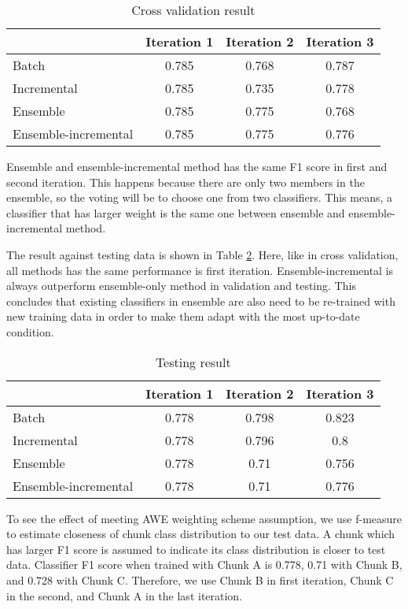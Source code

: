 \documentclass[conference]{IEEEtran}
\begin{document}
\begin{table}[!htb]
\renewcommand{\arraystretch}{1.3}
\caption{Cross validation result}
\label{result_k}
\centering
\begin{tabular}{|l|c|c|c|}
\hline
 & Iteration 1 & Iteration 2 & Iteration 3\\
\hline
Batch & 0.785 & 0.768 & 0.787\\
\hline
Incremental & 0.785 & 0.735 & 0.778\\
\hline
Ensemble & 0.785 & 0.775 & 0.768\\
\hline
Ensemble-incremental & 0.785 & 0.775 & 0.776\\
\hline
\end{tabular}
\end{table}

Ensemble and ensemble-incremental method has the same F1 score in first and second iteration.
This happens because there are only two members in the ensemble, so the voting will be to choose one from two classifiers.
This means, a classifier that has larger weight is the same one between ensemble and ensemble-incremental method.

The result against testing data is shown in Table \ref{result_test}.
Here, like in cross validation, all methods has the same performance is first iteration.
Ensemble-incremental is always outperform ensemble-only method in validation and testing.
This concludes that existing classifiers in ensemble are also need to be re-trained with new training data in order to make them adapt with the most up-to-date condition.

\begin{table}[!htb]
\renewcommand{\arraystretch}{1.3}
\caption{Testing result}
\label{result_test}
\centering
\begin{tabular}{|l|c|c|c|}
\hline
 & Iteration 1 & Iteration 2 & Iteration 3\\
\hline
Batch & 0.778 & 0.798 & 0.823\\
\hline
Incremental & 0.778 & 0.796 & 0.8\\
\hline
Ensemble & 0.778 & 0.71 & 0.756\\
\hline
Ensemble-incremental & 0.778 & 0.71 & 0.776\\
\hline
\end{tabular}
\end{table}

To see the effect of meeting AWE weighting scheme assumption, we use f-measure to estimate closeness of chunk class distribution to our test data.
A chunk which has larger F1 score is assumed to indicate its class distribution is closer to test data.
Classifier F1 score when trained with Chunk A is 0.778, 0.71 with Chunk B, and 0.728 with Chunk C.
Therefore, we use Chunk B in first iteration, Chunk C in the second, and Chunk A in the last iteration.
\end{document}
